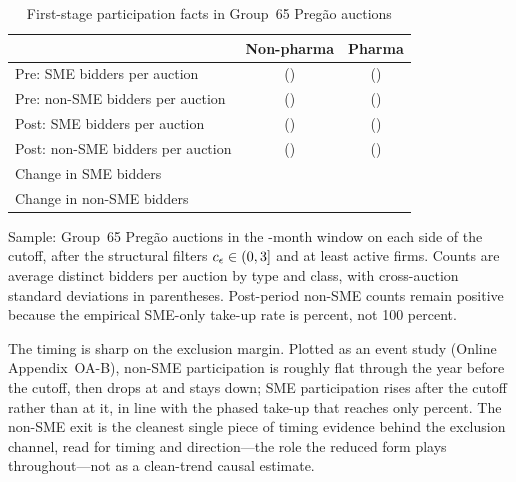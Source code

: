 \begin{table}[!htbp]
\centering
\begin{threeparttable}
\caption{First-stage participation facts in Group~65 Preg\~ao auctions}
\label{tab:first_stage_v8}
\small
\setlength{\tabcolsep}{6pt}
\begin{tabular}{lcc}
\toprule
 & Non-pharma & Pharma \\
\midrule
Pre: SME bidders per auction & \bneNsmePreNp{} (\bneNsmePreSdNp{}) & \bneNsmePrePh{} (\bneNsmePreSdPh{}) \\
Pre: non-SME bidders per auction & \bneNnsPreNp{} (\bneNnsPreSdNp{}) & \bneNnsPrePh{} (\bneNnsPreSdPh{}) \\
Post: SME bidders per auction & \bneNsmePostNp{} (\bneNsmePostSdNp{}) & \bneNsmePostPh{} (\bneNsmePostSdPh{}) \\
Post: non-SME bidders per auction & \nonSmePostNp{} (\bneNnsPostSdNp{}) & \nonSmePostPh{} (\bneNnsPostSdPh{}) \\
\addlinespace
Change in SME bidders & \bneNsmeDeltaNp{} & \bneNsmeDeltaPh{} \\
Change in non-SME bidders & \bneNnsDeltaNp{} & \bneNnsDeltaPh{} \\
\bottomrule
\end{tabular}
\begin{tablenotes}\footnotesize
\item Sample: Group~65 Preg\~ao auctions in the \structuralWindowM-month window
on each side of the \policyCutoffMonth{} cutoff, after the structural filters
$c_\epsilon\in(0,3]$ and at least \filterMinBidders{} active
firms. Counts are average distinct bidders per auction by type and class,
with cross-auction standard deviations in parentheses.
Post-period non-SME counts remain positive because the empirical SME-only
take-up rate is \adherenceGsixtyfivePost{} percent, not 100 percent.
\end{tablenotes}
\end{threeparttable}
\end{table}

The timing is sharp on the exclusion margin. Plotted as an event study
(Online Appendix~OA-B), non-SME participation is roughly flat through the
year before the cutoff, then drops at \policyCutoffMonth{} and stays
down; SME participation rises after the cutoff rather than at it, in line
with the phased take-up that reaches only \adherenceGsixtyfivePost{}
percent. The non-SME exit is the cleanest single piece of timing evidence
behind the exclusion channel, read for timing and direction---the role the
reduced form plays throughout---not as a clean-trend causal estimate.

